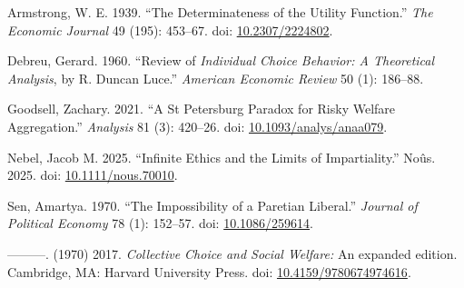 \documentclass[
  letterpaper,
  DIV=11,
  numbers=noendperiod,
  oneside]{scrartcl}
\newlength{\cslhangindent}
\newenvironment{CSLReferences}[2] %
 {\begin{list}{}{%
  \setlength{\itemindent}{0pt}
  \setlength{\leftmargin}{0pt}
  \setlength{\parsep}{0pt}
  \ifodd #1
   \setlength{\leftmargin}{\cslhangindent}
   \setlength{\itemindent}{-1\cslhangindent}
  \fi
  \setlength{\itemsep}{#2\baselineskip}}}
 {\end{list}}
\begin{document}
\label{refs}
\begin{CSLReferences}{1}{0}
Armstrong, W. E. 1939. {``The Determinateness of the Utility
Function.''} \emph{The Economic Journal} 49 (195): 453--67. doi:
\href{https://doi.org/10.2307/2224802}{10.2307/2224802}.

Debreu, Gerard. 1960. {``Review of \emph{Individual Choice Behavior: A
Theoretical Analysis}, by {R. Duncan Luce}.''} \emph{American Economic
Review} 50 (1): 186--88.

Goodsell, Zachary. 2021. {``A St Petersburg Paradox for Risky Welfare
Aggregation.''} \emph{Analysis} 81 (3): 420--26. doi:
\href{https://doi.org/10.1093/analys/anaa079}{10.1093/analys/anaa079}.

Nebel, Jacob M. 2025. {``Infinite Ethics and the Limits of
Impartiality.''} No{û}s. 2025. doi:
\href{https://doi.org/10.1111/nous.70010}{10.1111/nous.70010}.

Sen, Amartya. 1970. {``The Impossibility of a Paretian Liberal.''}
\emph{Journal of Political Economy} 78 (1): 152--57. doi:
\href{https://doi.org/10.1086/259614}{10.1086/259614}.

---------. (1970) 2017. \emph{Collective Choice and Social Welfare:} An
expanded edition. Cambridge, MA: Harvard University Press. doi:
\href{https://doi.org/10.4159/9780674974616}{10.4159/9780674974616}.

\end{CSLReferences}
\end{document}
